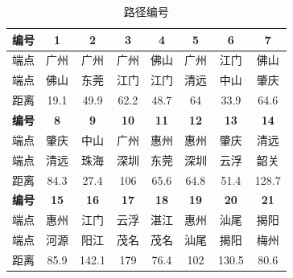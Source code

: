 \documentclass[UTF8,12pt]{ctexart}
\begin{document}
\begin{table}[htbp]
    \centering
    \caption{路径编号}
    \begin{footnotesize}

        \begin{tabular}{cccccccc}
            \toprule
            \textbf{编号} & \textbf{1}  & \textbf{2}  & \textbf{3}  & \textbf{4}  & \textbf{5}  & \textbf{6}  & \textbf{7}  \\
            \midrule
            端点          & 广州        & 广州        & 广州        & 佛山        & 广州        & 江门        & 佛山        \\
            \midrule
            端点          & 佛山        & 东莞        & 江门        & 江门        & 清远        & 中山        & 肇庆        \\
            \midrule
            距离          & 19.1        & 49.9        & 62.2        & 48.7        & 64          & 33.9        & 64.6        \\
            \midrule
            \textbf{编号} & \textbf{8}  & \textbf{9}  & \textbf{10} & \textbf{11} & \textbf{12} & \textbf{13} & \textbf{14} \\
            \midrule
            端点          & 肇庆        & 中山        & 广州        & 惠州        & 惠州        & 肇庆        & 清远        \\
            \midrule
            端点          & 清远        & 珠海        & 深圳        & 东莞        & 深圳        & 云浮        & 韶关        \\
            \midrule
            距离          & 84.3        & 27.4        & 106         & 65.6        & 64.8        & 51.4        & 128.7       \\
            \midrule
            \textbf{编号} & \textbf{15} & \textbf{16} & \textbf{17} & \textbf{18} & \textbf{19} & \textbf{20} & \textbf{21} \\
            \midrule
            端点          & 惠州        & 江门        & 云浮        & 湛江        & 惠州        & 汕尾        & 揭阳        \\
            \midrule
            端点          & 河源        & 阳江        & 茂名        & 茂名        & 汕尾        & 揭阳        & 梅州        \\
            \midrule
            距离          & 85.9        & 142.1       & 179         & 76.4        & 102         & 130.5       & 80.6        \\
            \bottomrule
        \end{tabular}%
    \end{footnotesize}
\end{table}%
\end{document}
